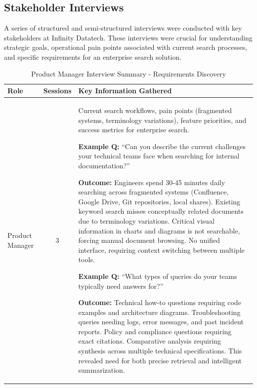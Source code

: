 \documentclass{report}
\begin{document}
\subsection{Stakeholder Interviews}
A series of structured and semi-structured interviews were conducted with key stakeholders at Infinity Datatech. These interviews were crucial for understanding strategic goals, operational pain points associated with current search processes, and specific requirements for an enterprise search solution.

\begin{table}[H]
\centering
\caption{Product Manager Interview Summary - Requirements Discovery}
\label{tab:pm_interview}
\begin{tabularx}{\textwidth}{|l|c|X|}
\hline
\textbf{Role} & \textbf{Sessions} & \textbf{Key Information Gathered} \\ 
\hline
Product Manager & 3 & Current search workflows, pain points (fragmented systems, terminology variations), feature priorities, and success metrics for enterprise search.

\textbf{Example Q:} ``Can you describe the current challenges your technical teams face when searching for internal documentation?''

\textbf{Outcome:} Engineers spend 30-45 minutes daily searching across fragmented systems (Confluence, Google Drive, Git repositories, local shares). Existing keyword search misses conceptually related documents due to terminology variations. Critical visual information in charts and diagrams is not searchable, forcing manual document browsing. No unified interface, requiring context switching between multiple tools.

\textbf{Example Q:} ``What types of queries do your teams typically need answers for?''

\textbf{Outcome:} Technical how-to questions requiring code examples and architecture diagrams. Troubleshooting queries needing logs, error messages, and past incident reports. Policy and compliance questions requiring exact citations. Comparative analysis requiring synthesis across multiple technical specifications. This revealed need for both precise retrieval and intelligent summarization. \\
\hline
\end{tabularx}
\end{table}
\end{document}
